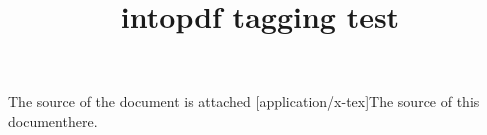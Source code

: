 \documentclass{article}
\title{intopdf tagging test}
\begin{document}
The source of the document is attached
[application/x-tex]{The source of this document}{here}.
\end{document}
